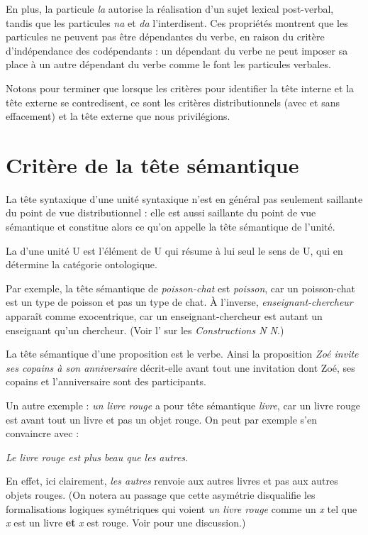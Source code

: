 En plus, la particule \textit{la} autorise la réalisation d’un sujet lexical post-verbal, tandis que les particules \textit{na} et \textit{da} l’interdisent. Ces propriétés montrent que les particules ne peuvent pas être dépendantes du verbe, en raison du critère d’indépendance des codépendants : un dépendant du verbe ne peut imposer sa place à un autre dépendant du verbe comme le font les particules verbales.

Notons pour terminer que lorsque les critères pour identifier la tête interne et la tête externe se contredisent, ce sont les critères distributionnels (avec et sans effacement) et la tête externe que nous privilégions.

\section{Critère de la tête sémantique}\label{sec:3.3.17}
\begin{sloppypar}
La tête syntaxique d’une unité syntaxique n’est en général pas seulement saillante du point de vue distributionnel : elle est aussi saillante du point de vue sémantique et constitue alors ce qu’on appelle la tête sémantique de l’unité.
\end{sloppypar}

{La  d’une unité U est l’élément de U qui résume à lui seul le sens de U, qui en détermine la catégorie ontologique.}

Par exemple, la tête sémantique de \textit{poisson-chat} est \textit{poisson}, car un poisson-chat est un type de poisson et pas un type de chat. À l’inverse, \textit{en\-sei\-gnant-cher\-cheur} apparaît comme exocentrique, car un en\-sei\-gnant-cher\-cheur est autant un enseignant qu’un chercheur. (Voir l’ sur les \textit{Constructions N N}.)

La tête sémantique d’une proposition est le verbe. Ainsi la proposition \textit{Zoé invite ses copains à son anniversaire} décrit-elle avant tout une invitation dont Zoé, ses copains et l’anniversaire sont des participants.

Un autre exemple : \textit{un livre rouge} a pour tête sémantique \textit{livre}, car un livre rouge est avant tout un livre et pas un objet rouge. On peut par exemple s’en convaincre avec :

\ea
    \textit{{Le livre rouge est plus beau que les autres.}}
\z

En effet, ici clairement, \textit{les autres} renvoie aux autres livres et pas aux autres objets rouges. (On notera au passage que cette asymétrie disqualifie les formalisations logiques symétriques qui voient \textit{un livre rouge} comme un \textit{x} tel que \textit{x} est un livre \textbf{et} \textit{x} est rouge. Voir \citealt{higginbotham1985semantics} pour une discussion.) 

